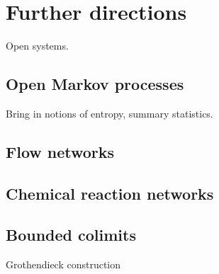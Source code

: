 \chapter{Further directions}

Open systems. 

\section{Open Markov processes}
Bring in notions of entropy, summary statistics. 
\section{Flow networks}

\section{Chemical reaction networks}

\section{Bounded colimits}


Grothendieck construction

